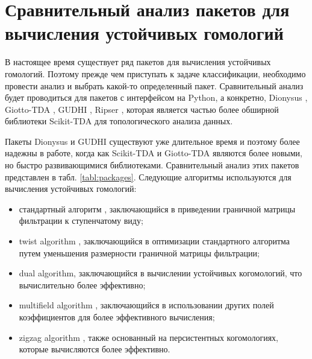 \section{Сравнительный анализ пакетов для вычисления устойчивых гомологий}

В настоящее время существует ряд пакетов для вычисления устойчивых гомологий. Поэтому прежде чем приступать к задаче классификации, необходимо провести анализ и выбрать какой-то определенный пакет. Сравнительный анализ будет проводиться для пакетов с интерфейсом на Python, а конкретно, Dionysus \cite{dionysus}, Giotto-TDA \cite{giotto}, GUDHI \cite{gudhi}, Ripser \cite{Ripser}, которая является частью более обширной библиотеки Scikit-TDA \cite{scikit} для топологического анализа данных. 

Пакеты Dionysus и GUDHI существуют уже длительное время и поэтому более надежны в работе, когда как Scikit-TDA и Giotto-TDA являются более новыми, но быстро развивающимися библиотеками.
Сравнительный анализ этих пакетов представлен в табл. \ref{tabl:packages}.
Следующие алгоритмы используются для вычисления устойчивых гомологий:
\begin{itemize}
	\item стандартный алгоритм \cite{Zomorodian}, заключающийся в приведении граничной матрицы фильтрации к ступенчатому виду;
	\item twist algorithm \cite{twist}, заключающийся в оптимизации стандартного алгоритма путем уменьшения размерности граничной матрицы фильтрации;
	\item dual algorithm, заключающийся в вычислении устойчивых когомологий, что вычислительно более эффективно;
	\item multifield algorithm \cite{multifield}, заключающийся в использовании других полей коэффициентов для более эффективного вычисления;
	\item zigzag algorithm \cite{zigzag}, также основанный на персистентных когомологиях, которые вычисляются более эффективно. 
\end{itemize}
